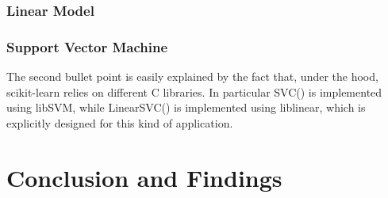 \documentclass[12pt,a4paper]{article}
\begin{document}


 

  \subsubsection{Linear Model}

  \subsubsection{Support Vector Machine}
    The second bullet point is easily explained by the fact that, under the hood, scikit-learn relies on different C libraries. In particular SVC() is implemented using libSVM, while LinearSVC() is implemented using liblinear, which is explicitly designed for this kind of application.



\section{Conclusion and Findings}




\end{document}
